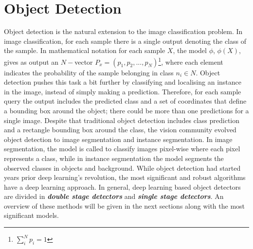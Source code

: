 \chapter{Object Detection} \label{Chapter:ObjectDetection}

Object detection is the natural extension to the image classification problem. In image classification, for each sample there is a single output denoting the class of the sample. In mathematical notation for each sample $X$, the model $\phi$, $\phi(X)$, gives as output an $N-$vector $P_x=(p_1,p_2,...,p_N)$\footnote{$\sum^N_i p_i=1$}, where each element indicates the probability of the sample belonging in class $n_i \in N$. Object detection pushes this task a bit further by classifying and localising an instance in the image, instead of simply making a prediction. Therefore, for each sample query the output includes the predicted class and a set of coordinates that define a bounding box around the object; there could be more than one predictions for a single image. Despite that traditional object detection includes class prediction and a rectangle bounding box around the class, the vision community evolved object detection to image segmentation and instance segmentation. In image segmentation, the model is called to classify images pixel-wise where each pixel represents a class, while in instance segmentation the model segments the observed classes in objects and background. While object detection had started years prior deep learning's revolution, the most significant and robust algorithms have a deep learning approach. In general, deep learning based object detectors are divided in \textbf{\textit{double stage detectors}} and \textbf{\textit{single stage detectors}}. An overview of these methods will be given in the next sections along with the most significant models. 

